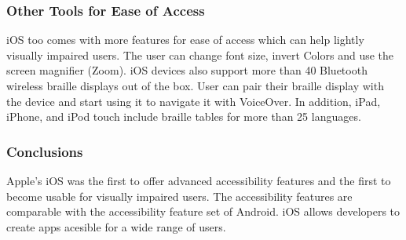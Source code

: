\subsubsection{Other Tools for Ease of Access}
iOS too comes with more features for ease of access which can help lightly visually impaired users. The user can change font size, invert Colors and use the screen magnifier (Zoom).
iOS devices also support more than 40 Bluetooth wireless braille displays out of the box. User can pair their braille display with the device and start using it to navigate it with VoiceOver. In addition, iPad, iPhone, and iPod touch include braille tables for more than 25 languages.

\subsubsection{Conclusions}
Apple's iOS was the first to offer advanced accessibility features and the first to become usable for visually impaired users. The accessibility features are comparable with the accessibility feature set of Android. iOS allows developers to create apps acesible for a wide range of users.
\endinput